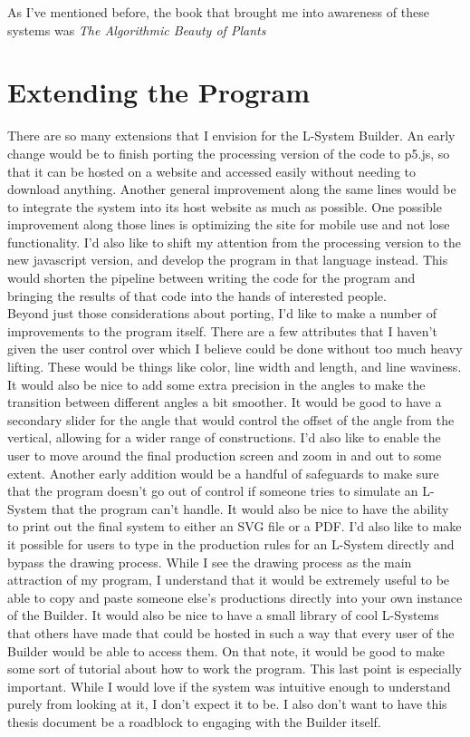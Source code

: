 \documentclass[12pt,twoside]{reedthesis}
\begin{document}
	
	As I've mentioned before, the book that brought me into awareness of these systems was \textit{The Algorithmic Beauty of Plants}

\section{Extending the Program}

	There are so many extensions that I envision for the L-System Builder. An early change would be to finish porting the processing version of the code to p5.js, so that it can be hosted on a website and accessed easily without needing to download anything. Another general improvement along the same lines would be to integrate the system into its host website as much as possible. One possible improvement along those lines is optimizing the site for mobile use and not lose functionality. I'd also like to shift my attention from the processing version to the new javascript version, and develop the program in that language instead. This would shorten the pipeline between writing the code for the program and bringing the results of that code into the hands of interested people.\\
	
	Beyond just those considerations about porting, I'd like to make a number of improvements to the program itself. There are a few attributes that I haven't given the user control over which I believe could be done without too much heavy lifting. These would be things like color, line width and length, and line waviness. It would also be nice to add some extra precision in the angles to make the transition between different angles a bit smoother. It would be good to have a secondary slider for the angle that would control the offset of the angle from the vertical, allowing for a wider range of constructions. I'd also like to enable the user to move around the final production screen and zoom in and out to some extent. Another early addition would be a handful of safeguards to make sure that the program doesn't go out of control if someone tries to simulate an L-System that the program can't handle. It would also be nice to have the ability to print out the final system to either an SVG file or a PDF. I'd also like to make it possible for users to type in the production rules for an L-System directly and bypass the drawing process. While I see the drawing process as the main attraction of my program, I understand that it would be extremely useful to be able to copy and paste someone else's productions directly into your own instance of the Builder. It would also be nice to have a small library of cool L-Systems that others have made that could be hosted in such a way that every user of the Builder would be able to access them. On that note, it would be good to make some sort of tutorial about how to work the program. This last point is especially important. While I would love if the system was intuitive enough to understand purely from looking at it, I don't expect it to be. I also don't want to have this thesis document be a roadblock to engaging with the Builder itself.\\
	
\end{document}
